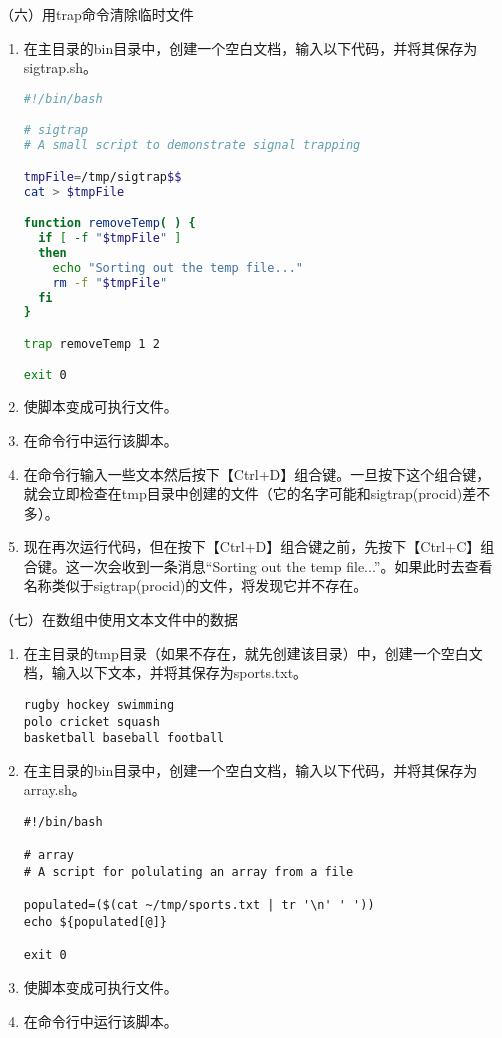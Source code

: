 \vspace{0.1in}
（六）用trap命令清除临时文件
\begin{enumerate}
  \item 在主目录的bin目录中，创建一个空白文档，输入以下代码，并将其保存为sigtrap.sh。
\begin{lstlisting}[language=bash]
#!/bin/bash

# sigtrap
# A small script to demonstrate signal trapping

tmpFile=/tmp/sigtrap$$
cat > $tmpFile

function removeTemp( ) {
  if [ -f "$tmpFile" ]
  then
    echo "Sorting out the temp file..."
    rm -f "$tmpFile"
  fi
}

trap removeTemp 1 2

exit 0
\end{lstlisting}
  \item 使脚本变成可执行文件。
  \item 在命令行中运行该脚本。
  \item 在命令行输入一些文本然后按下【Ctrl+D】组合键。一旦按下这个组合键，就会立即检查在tmp目录中创建的文件（它的名字可能和sigtrap(procid)差不多）。
  \item 现在再次运行代码，但在按下【Ctrl+D】组合键之前，先按下【Ctrl+C】组合键。这一次会收到一条消息``Sorting out the temp file...''。如果此时去查看名称类似于sigtrap(procid)的文件，将发现它并不存在。
\end{enumerate}

\vspace{0.1in}
（七）在数组中使用文本文件中的数据
\begin{enumerate}
  \item 在主目录的tmp目录（如果不存在，就先创建该目录）中，创建一个空白文档，输入以下文本，并将其保存为sports.txt。
\begin{verbatim}
rugby hockey swimming
polo cricket squash
basketball baseball football
\end{verbatim}
  \item 在主目录的bin目录中，创建一个空白文档，输入以下代码，并将其保存为array.sh。
\begin{lstlisting}
#!/bin/bash

# array
# A script for polulating an array from a file

populated=($(cat ~/tmp/sports.txt | tr '\n' ' '))
echo ${populated[@]}

exit 0
\end{lstlisting}
  \item 使脚本变成可执行文件。
  \item 在命令行中运行该脚本。
\end{enumerate}


